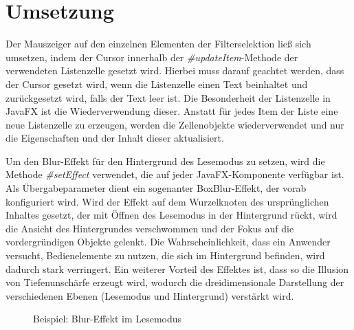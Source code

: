 \section{Umsetzung} \label{sec:optiImplementation}
Der Mauszeiger auf den einzelnen Elementen der Filterselektion ließ sich umsetzen, indem der Cursor innerhalb der \textit{\#{}updateItem}-Methode der verwendeten Listenzelle gesetzt wird. Hierbei muss darauf geachtet werden, dass der Cursor gesetzt wird, wenn die Listenzelle einen Text beinhaltet und zurückgesetzt wird, falls der Text leer ist. Die Besonderheit der Listenzelle in JavaFX ist die Wiederverwendung dieser. Anstatt für jedes Item der Liste eine neue Listenzelle zu erzeugen, werden die Zellenobjekte wiederverwendet und nur die Eigenschaften und der Inhalt dieser aktualisiert.\par
{}
Um den Blur-Effekt für den Hintergrund des Lesemodus zu setzen, wird die Methode \textit{\#{}setEffect} verwendet, die auf jeder JavaFX-Komponente verfügbar ist. Als Übergabeparameter dient ein sogenanter BoxBlur-Effekt, der vorab konfiguriert wird. Wird der Effekt auf dem Wurzelknoten des ursprünglichen Inhaltes gesetzt, der mit Öffnen des Lesemodus in der Hintergrund rückt, wird die Ansicht des Hintergrundes verschwommen und der Fokus auf die vordergründigen Objekte gelenkt. Die Wahrscheinlichkeit, dass ein Anwender versucht, Bedienelemente zu nutzen, die sich im Hintergrund befinden, wird dadurch stark verringert. Ein weiterer Vorteil des Effektes ist, dass so die Illusion von Tiefenunschärfe erzeugt wird, wodurch die dreidimensionale Darstellung der verschiedenen Ebenen (Lesemodus und Hintergrund) verstärkt wird.\par
\begin{figure}[H] 
	\centering
	\hspace{1.0em}
	\caption{Beispiel: Blur-Effekt im Lesemodus}
	\label{fig:blurGallery}
\end{figure}
